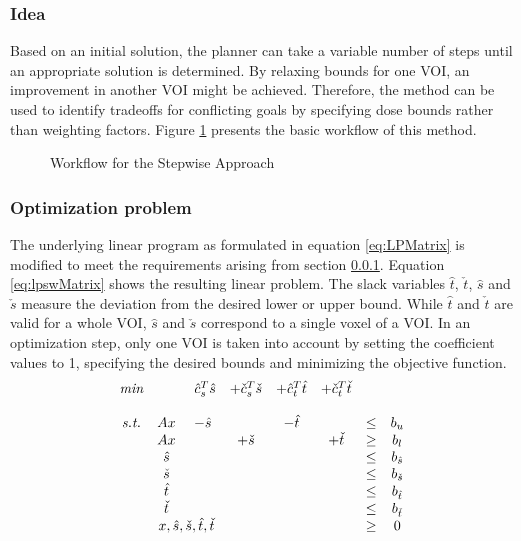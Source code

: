 \documentclass[12pt]{article}
\begin{document}
	\subsubsection{Idea}
		\label{subsec:lpswIdea}
		Based on an initial solution, the planner can take a variable number of steps until an appropriate solution is determined. By relaxing bounds for one VOI, an improvement in another VOI might be achieved. Therefore, the method can be used to identify tradeoffs for conflicting goals by specifying dose bounds rather than weighting factors. Figure \ref{fig:lpswWorkflow} presents the basic workflow of this method.
		
		\begin{figure}[ht]
			\centering
			 
			\caption{Workflow for the Stepwise Approach}
			\label{fig:lpswWorkflow}
		\end{figure}
		
	\subsubsection{Optimization problem}
		The underlying linear program as formulated in equation \ref{eq:LPMatrix} is modified to meet the requirements arising from section \ref{subsec:lpswIdea}. Equation \ref{eq:lpswMatrix} shows the resulting linear problem. The slack variables $\hat{t}$, $\check{t}$, $\hat{s}$ and $\check{s}$ measure the deviation from the desired lower or upper bound. While $\hat{t}$ and $\check{t}$ are valid for a whole VOI, $\hat{s}$ and $\check{s}$ correspond to a single voxel of a VOI. In an optimization step, only one VOI is taken into account by setting the coefficient values to 1, specifying the desired bounds and minimizing the objective function.
		\begin{equation}
			\label{eq:lpswMatrix}
			\begin{matrix}
			\textit{min} &            & ~\hat{c}_s^T\hat{s} & +\check{c}_s^T\check{s}    & +\hat{c}_t^T\hat{t} & +\check{c}_t^T\check{t} & & \\\\
			\textit{s.t.} & Ax         & -\hat{s}            &            & -\hat{t}  &            & \leq & b_u\\
     & Ax         & 		            & +\check{s} &           & +\check{t} & \geq & b_l\\
			   	 & \hat{s}    & 		            &            &           &            & \leq & b_{\hat{s}}\\
          & \check{s}  & 	                &            &           &            & \leq & b_{\check{s}}\\
          & \hat{t}    & 		            &            &           &            & \leq & b_{\hat{t}}\\
          & \check{t}  & 	                &            &           &            & \leq & b_{\check{t}}\\
				 & \multicolumn{2}{c}{x,\hat{s},\check{s},\hat{t},\check{t}} & & & & \geq & 0
			\end{matrix}		
		\end{equation}
	
\end{document}

